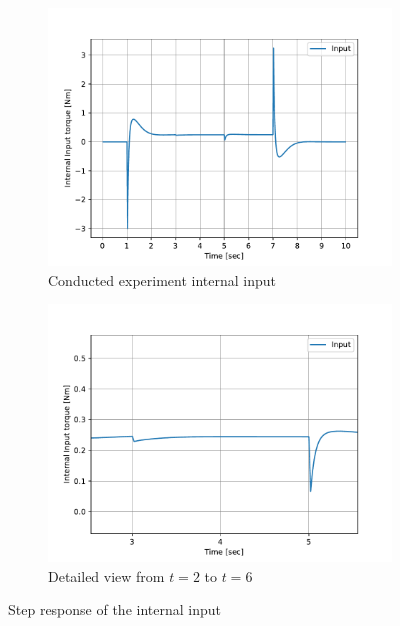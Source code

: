 \begin{figure}[h]
	\centering
	\begin{subfigure}[t]{0.45\textwidth}
		\centering
		\includegraphics[width=\textwidth]{Step Response of the Internal Input}
		\caption{Conducted experiment internal input}
		\label{fig:Step response of the internal input}
	\end{subfigure}
	\begin{subfigure}[t]{0.45\textwidth}
		\centering
		\includegraphics[width=\textwidth]{Step Response of the Internal Input hip angle}
		\caption{Detailed view from $t=2$ to $t=6$}
		\label{fig:Step response of the hip and knee angles}
	\end{subfigure}
	\caption{Step response of the internal input}
	\label{fig:Step response of the internal input}
\end{figure}
